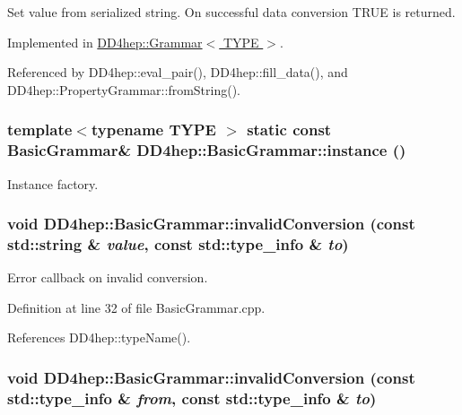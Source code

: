 Set value from serialized string. On successful data conversion TRUE is returned. 

Implemented in \hyperlink{class_d_d4hep_1_1_grammar_a275a87cbf97f851be158441d373ae2b2}{DD4hep::Grammar$<$ TYPE $>$}.

Referenced by DD4hep::eval\_\-pair(), DD4hep::fill\_\-data(), and DD4hep::PropertyGrammar::fromString().\hypertarget{class_d_d4hep_1_1_basic_grammar_a1b543c027be4ac45b5b6aed3afc487c9}{
\subsubsection[{instance}]{\setlength{\rightskip}{0pt plus 5cm}template$<$typename TYPE $>$ static const {\bf BasicGrammar}\& DD4hep::BasicGrammar::instance ()}}
\label{class_d_d4hep_1_1_basic_grammar_a1b543c027be4ac45b5b6aed3afc487c9}


Instance factory. \hypertarget{class_d_d4hep_1_1_basic_grammar_a5320dae6f06b901657f0839870a46fa1}{
\subsubsection[{invalidConversion}]{\setlength{\rightskip}{0pt plus 5cm}void DD4hep::BasicGrammar::invalidConversion (const std::string \& {\em value}, \/  const std::type\_\-info \& {\em to})}}
\label{class_d_d4hep_1_1_basic_grammar_a5320dae6f06b901657f0839870a46fa1}


Error callback on invalid conversion. 

Definition at line 32 of file BasicGrammar.cpp.

References DD4hep::typeName().\hypertarget{class_d_d4hep_1_1_basic_grammar_ac609599119a3a478c5701d0b18d4992a}{
\subsubsection[{invalidConversion}]{\setlength{\rightskip}{0pt plus 5cm}void DD4hep::BasicGrammar::invalidConversion (const std::type\_\-info \& {\em from}, \/  const std::type\_\-info \& {\em to})}}
\label{class_d_d4hep_1_1_basic_grammar_ac609599119a3a478c5701d0b18d4992a}


